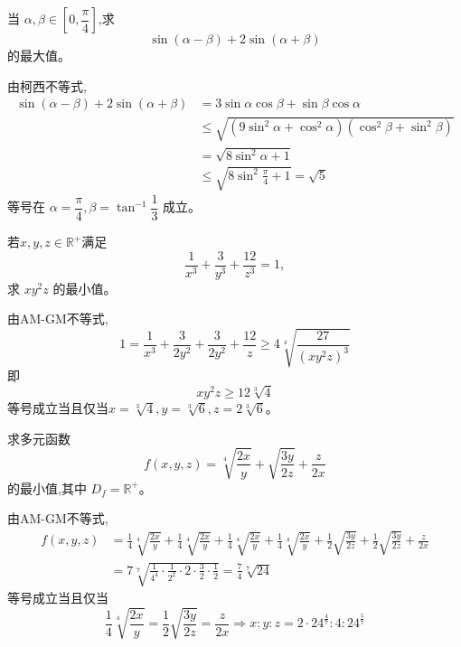 \begin{questions}
    \question 当 $\alpha, \beta \in \left[0, \dfrac{\pi}{4}\right]$,求 
    \[
    \sin(\alpha-\beta) + 2\sin(\alpha+\beta)
    \]
    的最大值。
    \begin{solution}
        由柯西不等式,
        \begin{align*}
        \sin(\alpha-\beta) + 2\sin(\alpha+\beta)
        &= 3\sin\alpha\cos\beta + \sin\beta\cos\alpha \\
        &\le \sqrt{(9\sin^2 \alpha + \cos^2 \alpha)(\cos^2 \beta + \sin^2 \beta)}\\
        &= \sqrt{8\sin^2 \alpha + 1} \\
        &\le \sqrt{8\sin^2 \frac{\pi}{4} + 1} = \sqrt{5}
        \end{align*}
        等号在 $\alpha = \dfrac{\pi}{4}, \beta = \tan^{-1} \dfrac{1}{3}$ 成立。
    \end{solution}

    \question 若$x, y, z \in \mathbb{R}^+$满足 
    \[
    \frac{1}{x^3} + \frac{3}{y^3} + \frac{12}{z^3} = 1,
    \]
    求 $xy^2z$ 的最小值。
    \begin{solution}
        由AM-GM不等式,
        \[
        1 = \frac{1}{x^3} + \frac{3}{2y^2} + \frac{3}{2y^2} + \frac{12}{z} \ge 4 \sqrt[4]{\frac{27}{(xy^2z)^3}}
        \]
        即
        \[
        xy^2z \ge 12 \sqrt[3]{4}
        \]
        等号成立当且仅当$x = \sqrt[3]{4}, y = \sqrt[3]{6}, z  = 2\sqrt[3]{6}$。
    \end{solution}

    \question 求多元函数 
    \[
    f(x, y, z) = \sqrt[4]{\frac{2x}{y}} + \sqrt{\frac{3y}{2z}} + \frac{z}{2x}
    \]
    的最小值,其中 $D_f = \mathbb{R}^+$。
    \begin{solution}
        由AM-GM不等式,
        \begin{align*}
        f(x, y, z) &= \frac{1}{4}\sqrt[4]{\frac{2x}{y}} + \frac{1}{4}\sqrt[4]{\frac{2x}{y}} + \frac{1}{4}\sqrt[4]{\frac{2x}{y}} + \frac{1}{4}\sqrt[4]{\frac{2x}{y}} + \frac{1}{2}\sqrt{\frac{3y}{2z}} + \frac{1}{2}\sqrt{\frac{3y}{2z}} + \frac{z}{2x} \\
        &= 7 \sqrt[7]{\frac{1}{4^4}\cdot\frac{1}{2^2}\cdot2\cdot\frac{3}{2}\cdot\frac{1}{2}} = \frac{7}{4}\sqrt[7]{24}
        \end{align*}
        等号成立当且仅当
        \[
        \frac{1}{4}\sqrt[4]{\frac{2x}{y}} = \frac{1}{2}\sqrt{\frac{3y}{2z}} = \frac{z}{2x} \Rightarrow x :y :z = 2 \cdot 24^{\frac{4}{7}} :4 :24^{\frac{5}{7}}
        \]
    \end{solution}


\end{questions}

